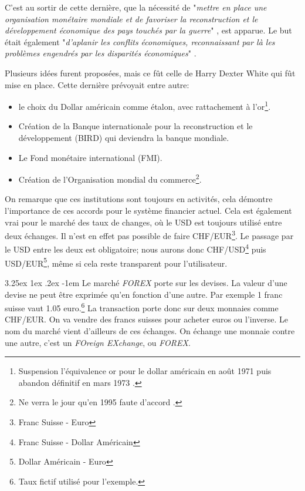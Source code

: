 \documentclass[a4paper, 11pt]{article}
\makeatletter
\renewcommand\paragraph{\@startsection{paragraph}{5}{\z@}%
  {3.25ex \@plus1ex \@minus.2ex}%
  {-1em}%
  {\normalfont\normalsize\bfseries}}
\makeatother
\begin{document}
C'est au sortir de cette dernière, que la nécessité de "\textit{mettre en place une organisation monétaire mondiale et de favoriser la reconstruction et le développement économique des pays touchés par la guerre}" \cite{wikipedia_bretten_woods}, est apparue. Le but était également "\textit{d’aplanir les conflits économiques, reconnaissant par là les problèmes engendrés par les disparités économiques}" \cite{etalon_or_a_etalon_dollar}.

Plusieurs idées furent proposées, mais ce fût celle de Harry Dexter White qui fût mise en place. Cette dernière prévoyait entre autre:
\begin{itemize}
\item le choix du Dollar américain comme étalon, avec rattachement à l'or\footnote{Suspension l'équivalence or pour le dollar américain en août 1971 puis abandon définitif en mars 1973 \cite{wikipedia_bretten_woods}.}.
\item Création de la Banque internationale pour la reconstruction et le développement (BIRD) qui deviendra la banque mondiale.
\item Le Fond monétaire international (FMI).
\item Création de l'Organisation mondial du commerce\footnote{Ne verra le jour qu'en 1995 faute d'accord \cite{wikipedia_bretten_woods}.}.
\end{itemize}

On remarque que ces institutions sont toujours en activités, cela démontre l'importance de ces accords pour le système financier actuel. Cela est également vrai pour le marché des taux de changes, où le USD est toujours utilisé entre deux échanges.
Il n'est en effet pas possible de faire CHF/EUR\footnote{Franc Suisse - Euro}. Le passage par le USD entre les deux est obligatoire; nous aurons donc CHF/USD\footnote{Franc Suisse - Dollar Américain} puis USD/EUR\footnote{Dollar Américain - Euro}, même si cela reste transparent pour l'utilisateur.

\paragraph{}
Le marché \textit{FOREX} porte sur les devises. La valeur d'une devise ne peut être exprimée qu'en fonction d'une autre. Par exemple 1 franc suisse vaut 1.05 euro.\footnote{Taux fictif utilisé pour l'exemple.}
La transaction porte donc sur deux monnaies comme CHF/EUR. On va vendre des francs suisses pour acheter euros ou l'inverse.
Le nom du marché vient d'ailleurs de ces échanges. On échange une monnaie contre une autre, c'est un \textit{FOreign EXchange}, ou \textit{FOREX}.
\end{document}
